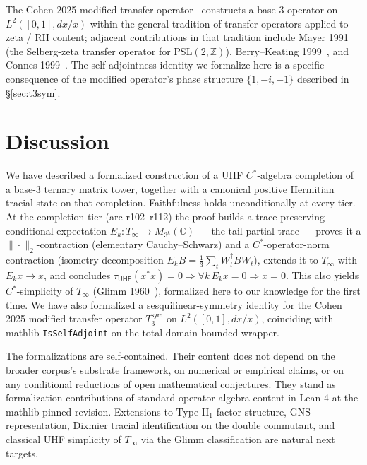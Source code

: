 \documentclass[11pt,a4paper]{amsart}
\theoremstyle{plain}
\theoremstyle{definition}
\begin{document}
The Cohen 2025 modified transfer operator~\cite{cohen2025transferOp} constructs a base-3 operator on $L^2([0,1], dx/x)$ within the general tradition of transfer operators applied to zeta / RH content; adjacent contributions in that tradition include Mayer 1991~\cite{mayer1991} (the Selberg-zeta transfer operator for PSL$(2, \mathbb{Z})$), Berry--Keating 1999~\cite{berry-keating1999}, and Connes 1999~\cite{connes1999}. The self-adjointness identity we formalize here is a specific consequence of the modified operator's phase structure $\{1, -i, -1\}$ described in \S\ref{sec:t3sym}.

\section{Discussion}\label{sec:discussion}

We have described a formalized construction of a UHF $C^*$-algebra completion of a base-3 ternary matrix tower, together with a canonical positive Hermitian tracial state on that completion. Faithfulness holds unconditionally at every tier. At the completion tier (arc r102--r112) the proof builds a trace-preserving conditional expectation $E_k \colon T_\infty \to M_{3^k}(\mathbb{C})$ --- the tail partial trace --- proves it a $\|\cdot\|_2$-contraction (elementary Cauchy--Schwarz) and a $C^*$-operator-norm contraction (isometry decomposition $E_k B = \tfrac13\sum_t W_t^\dagger B W_t$), extends it to $T_\infty$ with $E_k x \to x$, and concludes $\tau_{\textsf{UHF}}(x^*x)=0 \Rightarrow \forall k\,E_k x = 0 \Rightarrow x=0$. This also yields $C^*$-simplicity of $T_\infty$ (Glimm 1960~\cite{glimm1960}), formalized here to our knowledge for the first time. We have also formalized a sesquilinear-symmetry identity for the Cohen 2025 modified transfer operator $T_3^{\textsf{sym}}$ on $L^2([0,1], dx/x)$, coinciding with mathlib \texttt{IsSelfAdjoint} on the total-domain bounded wrapper.

The formalizations are self-contained. Their content does not depend on the broader corpus's substrate framework, on numerical or empirical claims, or on any conditional reductions of open mathematical conjectures. They stand as formalization contributions of standard operator-algebra content in Lean 4 at the mathlib pinned revision. Extensions to Type II$_1$ factor structure, GNS representation, Dixmier tracial identification on the double commutant, and classical UHF simplicity of $T_\infty$ via the Glimm classification are natural next targets.
\end{document}
